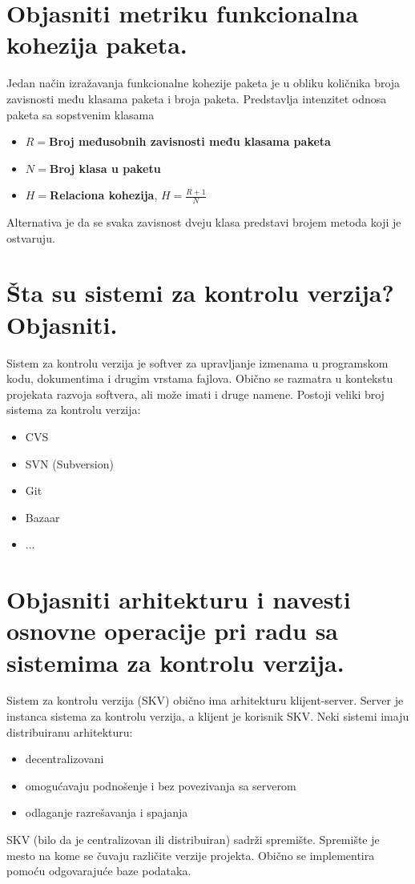 \documentclass[a4paper]{article}
\begin{document}
\section{Objasniti metriku funkcionalna kohezija paketa.}
  Jedan način izražavanja funkcionalne kohezije paketa je u obliku količnika broja zavisnosti 
  među klasama paketa i broja paketa. Predstavlja intenzitet odnosa paketa sa sopstvenim klasama
  \begin{itemize}
    \item \textbf{$R = $Broj međusobnih zavisnosti među klasama paketa} 
    \item \textbf{$N = $Broj klasa u paketu}
    \item \textbf{$H = $Relaciona kohezija}, $H = \frac{R+1}{N}$
  \end{itemize}
  Alternativa je da se svaka zavisnost dveju klasa predstavi brojem metoda koji je ostvaruju.
  
\section{Šta su sistemi za kontrolu verzija? Objasniti.}
  Sistem za kontrolu verzija je softver za upravljanje izmenama u programskom kodu, 
  dokumentima i drugim vrstama fajlova. Obično se razmatra u kontekstu projekata razvoja 
  softvera, ali može imati i druge namene. Postoji veliki broj sistema za kontrolu verzija:
  \begin{itemize}
    \item CVS
    \item SVN (Subversion)
    \item Git
    \item Bazaar
    \item ...
  \end{itemize}
\section{Objasniti arhitekturu i navesti osnovne operacije pri radu sa sistemima za kontrolu verzija.}
  Sistem za kontrolu verzija (SKV) obično ima arhitekturu klijent-server. 
  Server je instanca sistema za kontrolu verzija, a klijent je korisnik SKV.
  Neki sistemi imaju distribuiranu arhitekturu:
  \begin{itemize}
    \item decentralizovani
    \item omogućavaju podnošenje i bez povezivanja sa serverom
    \item odlaganje razrešavanja i spajanja
  \end{itemize}
  SKV (bilo da je centralizovan ili distribuiran) sadrži spremište. 
  Spremište je mesto na kome se čuvaju različite verzije projekta. 
  Obično se implementira pomoću odgovarajuće baze podataka.
  
\end{document}
